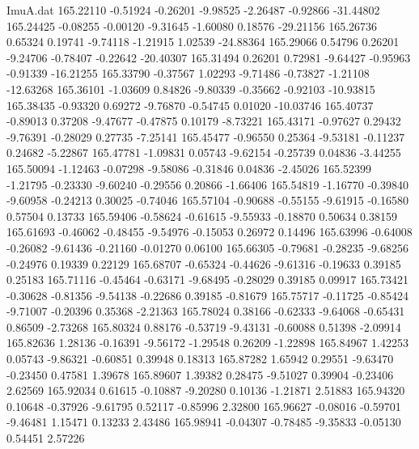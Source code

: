\begin{filecontents}{ImuA.dat}
 165.22110   -0.51924   -0.26201   -9.98525   -2.26487   -0.92866  -31.44802
 165.24425   -0.08255   -0.00120   -9.31645   -1.60080    0.18576  -29.21156
 165.26736    0.65324    0.19741   -9.74118   -1.21915    1.02539  -24.88364
 165.29066    0.54796    0.26201   -9.24706   -0.78407   -0.22642  -20.40307
 165.31494    0.26201    0.72981   -9.64427   -0.95963   -0.91339  -16.21255
 165.33790   -0.37567    1.02293   -9.71486   -0.73827   -1.21108  -12.63268
 165.36101   -1.03609    0.84826   -9.80339   -0.35662   -0.92103  -10.93815
 165.38435   -0.93320    0.69272   -9.76870   -0.54745    0.01020  -10.03746
 165.40737   -0.89013    0.37208   -9.47677   -0.47875    0.10179   -8.73221
 165.43171   -0.97627    0.29432   -9.76391   -0.28029    0.27735   -7.25141
 165.45477   -0.96550    0.25364   -9.53181   -0.11237    0.24682   -5.22867
 165.47781   -1.09831    0.05743   -9.62154   -0.25739    0.04836   -3.44255
 165.50094   -1.12463   -0.07298   -9.58086   -0.31846    0.04836   -2.45026
 165.52399   -1.21795   -0.23330   -9.60240   -0.29556    0.20866   -1.66406
 165.54819   -1.16770   -0.39840   -9.60958   -0.24213    0.30025   -0.74046
 165.57104   -0.90688   -0.55155   -9.61915   -0.16580    0.57504    0.13733
 165.59406   -0.58624   -0.61615   -9.55933   -0.18870    0.50634    0.38159
 165.61693   -0.46062   -0.48455   -9.54976   -0.15053    0.26972    0.14496
 165.63996   -0.64008   -0.26082   -9.61436   -0.21160   -0.01270    0.06100
 165.66305   -0.79681   -0.28235   -9.68256   -0.24976    0.19339    0.22129
 165.68707   -0.65324   -0.44626   -9.61316   -0.19633    0.39185    0.25183
 165.71116   -0.45464   -0.63171   -9.68495   -0.28029    0.39185    0.09917
 165.73421   -0.30628   -0.81356   -9.54138   -0.22686    0.39185   -0.81679
 165.75717   -0.11725   -0.85424   -9.71007   -0.20396    0.35368   -2.21363
 165.78024    0.38166   -0.62333   -9.64068   -0.65431    0.86509   -2.73268
 165.80324    0.88176   -0.53719   -9.43131   -0.60088    0.51398   -2.09914
 165.82636    1.28136   -0.16391   -9.56172   -1.29548    0.26209   -1.22898
 165.84967    1.42253    0.05743   -9.86321   -0.60851    0.39948    0.18313
 165.87282    1.65942    0.29551   -9.63470   -0.23450    0.47581    1.39678
 165.89607    1.39382    0.28475   -9.51027    0.39904   -0.23406    2.62569
 165.92034    0.61615   -0.10887   -9.20280    0.10136   -1.21871    2.51883
 165.94320    0.10648   -0.37926   -9.61795    0.52117   -0.85996    2.32800
 165.96627   -0.08016   -0.59701   -9.46481    1.15471    0.13233    2.43486
 165.98941   -0.04307   -0.78485   -9.35833   -0.05130    0.54451    2.57226

\end{filecontents}
